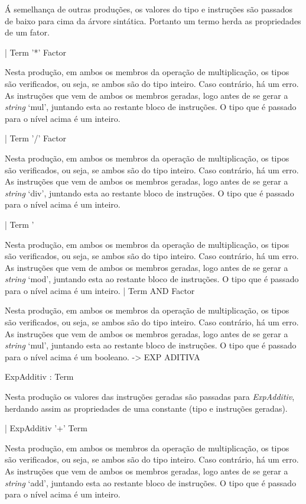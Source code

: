 Á semelhança de outras produções, os valores do tipo e instruções são passados
de baixo para cima da árvore sintática. Portanto um termo herda as propriedades
de um fator.

|  Term '*' Factor       

Nesta  produção, em ambos os membros da operação de multiplicação, os tipos são
verificados, ou seja, se ambos são do tipo inteiro. Caso contrário, há um erro.
As instruções que vem de ambos os membros geradas, logo antes de se gerar
a \emph{string} `mul', juntando esta ao restante bloco de instruções. 
O tipo que é passado para o nível acima é um  inteiro.
  
|  Term '/' Factor       

Nesta  produção, em ambos os membros da operação de multiplicação, os tipos são
verificados, ou seja, se ambos são do tipo inteiro. Caso contrário, há um erro.
As instruções que vem de ambos os membros geradas, logo antes de se gerar
a \emph{string} `div', juntando esta ao restante bloco de instruções. 
O tipo que é passado para o nível acima é um  inteiro.
 
|  Term '%


Nesta  produção, em ambos os membros da operação de multiplicação, os tipos são
verificados, ou seja, se ambos são do tipo inteiro. Caso contrário, há um erro.
As instruções que vem de ambos os membros geradas, logo antes de se gerar
a \emph{string} `mod', juntando esta ao restante bloco de instruções. 
O tipo que é passado para o nível acima é um inteiro.
|  Term AND Factor       


Nesta  produção, em ambos os membros da operação de multiplicação, os tipos são
verificados, ou seja, se ambos são do tipo inteiro. Caso contrário, há um erro.
As instruções que vem de ambos os membros geradas, logo antes de se gerar
a \emph{string} `mul', juntando esta ao restante bloco de instruções. 
O tipo que é passado para o nível acima é um  booleano.
-> EXP ADITIVA

ExpAdditiv : Term      


Nesta produção os valores das instruções geradas são passadas para
\emph{ExpAdditiv}, herdando assim as propriedades de uma constante (tipo
e instruções geradas).

| ExpAdditiv '+' Term  

Nesta  produção, em ambos os membros da operação de multiplicação, os tipos são
verificados, ou seja, se ambos são do tipo inteiro. Caso contrário, há um erro.
As instruções que vem de ambos os membros geradas, logo antes de se gerar
a \emph{string} `add', juntando esta ao restante bloco de instruções. 
O tipo que é passado para o nível acima é um  inteiro.

